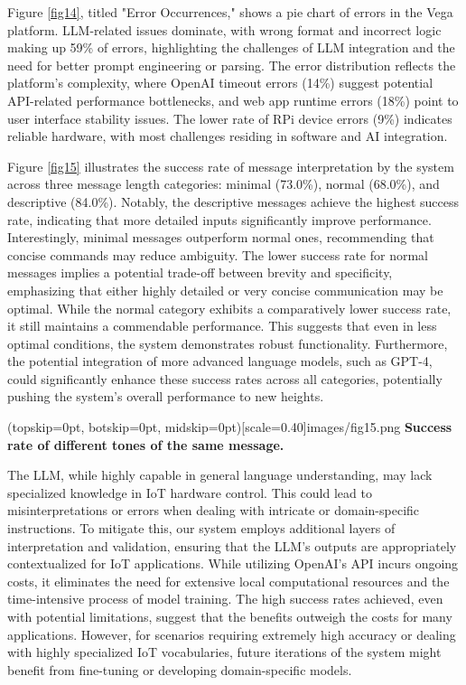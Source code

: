 \documentclass{ieeeaccess}
\begin{document}
Figure \ref{fig14}, titled "Error Occurrences," shows a pie chart of errors in the Vega platform. LLM-related issues dominate, with wrong format and incorrect logic making up 59\% of errors, highlighting the challenges of LLM integration and the need for better prompt engineering or parsing. The error distribution reflects the platform's complexity, where OpenAI timeout errors (14\%) suggest potential API-related performance bottlenecks, and web app runtime errors (18\%) point to user interface stability issues. The lower rate of RPi device errors (9\%) indicates reliable hardware, with most challenges residing in software and AI integration.

Figure \ref{fig15} illustrates the success rate of message interpretation by the system across three message length categories: minimal (73.0\%), normal (68.0\%), and descriptive (84.0\%). Notably, the descriptive messages achieve the highest success rate, indicating that more detailed inputs significantly improve performance. Interestingly, minimal messages outperform normal ones, recommending that concise commands may reduce ambiguity. The lower success rate for normal messages implies a potential trade-off between brevity and specificity, emphasizing that either highly detailed or very concise communication may be optimal. While the normal category exhibits a comparatively lower success rate, it still maintains a commendable performance. This suggests that even in less optimal conditions, the system demonstrates robust functionality. Furthermore, the potential integration of more advanced language models, such as GPT-4, could significantly enhance these success rates across all categories, potentially pushing the system's overall performance to new heights.

\Figure[t!](topskip=0pt, botskip=0pt,
midskip=0pt)[scale=0.40]{{images/fig15.png}}
{ \textbf{Success rate of different tones of the same message.}\label{fig15}}

The LLM, while highly capable in general language understanding, may lack specialized knowledge in IoT hardware control. This could lead to misinterpretations or errors when dealing with intricate or domain-specific instructions. To mitigate this, our system employs additional layers of interpretation and validation, ensuring that the LLM's outputs are appropriately contextualized for IoT applications. While utilizing OpenAI's API incurs ongoing costs, it eliminates the need for extensive local computational resources and the time-intensive process of model training. The high success rates achieved, even with potential limitations, suggest that the benefits outweigh the costs for many applications. However, for scenarios requiring extremely high accuracy or dealing with highly specialized IoT vocabularies, future iterations of the system might benefit from fine-tuning or developing domain-specific models.
\end{document}
